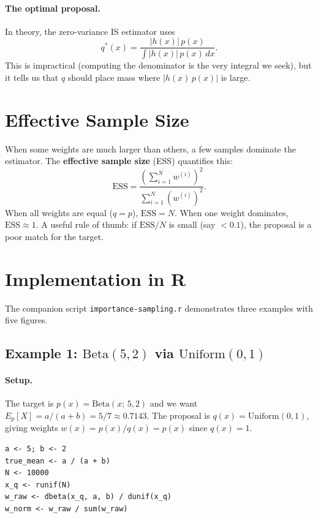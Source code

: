 \documentclass[11pt]{article}
\newcommand{\R}{\textsf{R}}
\begin{document}
\paragraph{The optimal proposal.}
In theory, the zero-variance IS estimator uses
\[
  q^*(x) = \frac{|h(x)|\,p(x)}{\int |h(x)|\,p(x)\,dx}.
\]
This is impractical (computing the denominator is the very integral we seek), but it tells us that $q$ should place mass where $|h(x)\,p(x)|$ is large.

\section{Effective Sample Size}

When some weights are much larger than others, a few samples dominate the estimator.  The \textbf{effective sample size} (ESS) quantifies this:
\[
  \mathrm{ESS} = \frac{\left(\sum_{i=1}^N w^{(i)}\right)^2}{\sum_{i=1}^N \left(w^{(i)}\right)^2}.
\]
When all weights are equal ($q = p$), $\mathrm{ESS} = N$.  When one weight dominates, $\mathrm{ESS} \approx 1$.  A useful rule of thumb: if $\mathrm{ESS}/N$ is small (say $< 0.1$), the proposal is a poor match for the target.

\section{Implementation in \R}

The companion script \texttt{importance-sampling.r} demonstrates three examples with five figures.

\subsection{Example 1: $\mathrm{Beta}(5,2)$ via $\mathrm{Uniform}(0,1)$}

\paragraph{Setup.}
The target is $p(x) = \mathrm{Beta}(x;\,5,2)$ and we want $E_p[X] = a/(a+b) = 5/7 \approx 0.7143$.  The proposal is $q(x) = \mathrm{Uniform}(0,1)$, giving weights $w(x) = p(x)/q(x) = p(x)$ since $q(x) = 1$.

\begin{lstlisting}
a <- 5; b <- 2
true_mean <- a / (a + b)
N <- 10000
x_q <- runif(N)
w_raw <- dbeta(x_q, a, b) / dunif(x_q)
w_norm <- w_raw / sum(w_raw)
\end{lstlisting}
\end{document}
